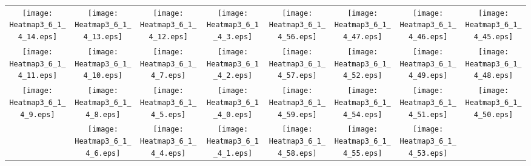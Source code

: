 \documentclass{standalone}
\begin{document}
\begin{tabular}{ *8{c} }
\texttt{[image: Heatmap3\_6\_1\_4\_14.eps]} & \texttt{[image: Heatmap3\_6\_1\_4\_13.eps]} & \texttt{[image: Heatmap3\_6\_1\_4\_12.eps]} & \texttt{[image: Heatmap3\_6\_1\_4\_3.eps]} & \texttt{[image: Heatmap3\_6\_1\_4\_56.eps]} & \texttt{[image: Heatmap3\_6\_1\_4\_47.eps]} & \texttt{[image: Heatmap3\_6\_1\_4\_46.eps]} & \texttt{[image: Heatmap3\_6\_1\_4\_45.eps]} \\
\texttt{[image: Heatmap3\_6\_1\_4\_11.eps]} & \texttt{[image: Heatmap3\_6\_1\_4\_10.eps]} & \texttt{[image: Heatmap3\_6\_1\_4\_7.eps]} & \texttt{[image: Heatmap3\_6\_1\_4\_2.eps]} & \texttt{[image: Heatmap3\_6\_1\_4\_57.eps]} & \texttt{[image: Heatmap3\_6\_1\_4\_52.eps]} & \texttt{[image: Heatmap3\_6\_1\_4\_49.eps]} & \texttt{[image: Heatmap3\_6\_1\_4\_48.eps]} \\
\texttt{[image: Heatmap3\_6\_1\_4\_9.eps]} & \texttt{[image: Heatmap3\_6\_1\_4\_8.eps]} & \texttt{[image: Heatmap3\_6\_1\_4\_5.eps]} & \texttt{[image: Heatmap3\_6\_1\_4\_0.eps]} & \texttt{[image: Heatmap3\_6\_1\_4\_59.eps]} & \texttt{[image: Heatmap3\_6\_1\_4\_54.eps]} & \texttt{[image: Heatmap3\_6\_1\_4\_51.eps]} & \texttt{[image: Heatmap3\_6\_1\_4\_50.eps]} \\
 & \texttt{[image: Heatmap3\_6\_1\_4\_6.eps]} & \texttt{[image: Heatmap3\_6\_1\_4\_4.eps]} & \texttt{[image: Heatmap3\_6\_1\_4\_1.eps]} & \texttt{[image: Heatmap3\_6\_1\_4\_58.eps]} & \texttt{[image: Heatmap3\_6\_1\_4\_55.eps]} & \texttt{[image: Heatmap3\_6\_1\_4\_53.eps]} &  
\end{tabular}
\end{document}
